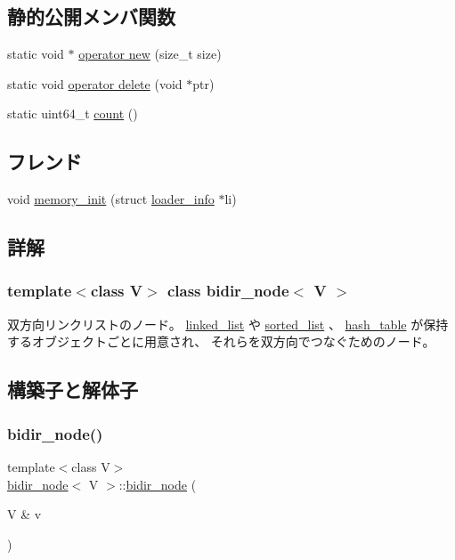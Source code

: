 \subsection*{静的公開メンバ関数}
\begin{DoxyCompactItemize}
\item 
static void $\ast$ \hyperlink{classbidir__node_aec71c6df26420dff2ffdf5a43f8b613e}{operator new} (size\+\_\+t size)
\item 
static void \hyperlink{classbidir__node_a50277ce12bf4fccf682ad0a7d70b4e0b}{operator delete} (void $\ast$ptr)
\item 
static uint64\+\_\+t \hyperlink{classbidir__node_a9851f8255f82458826f5a4c615de9a2a}{count} ()
\end{DoxyCompactItemize}
\subsection*{フレンド}
\begin{DoxyCompactItemize}
\item 
void \hyperlink{classbidir__node_a8840f01b46a3b9c43a461591a579c1bd}{memory\+\_\+init} (struct \hyperlink{structloader__info}{loader\+\_\+info} $\ast$li)
\end{DoxyCompactItemize}


\subsection{詳解}
\subsubsection*{template$<$class V$>$\newline
class bidir\+\_\+node$<$ V $>$}

双方向リンクリストのノード。 \hyperlink{classlinked__list}{linked\+\_\+list} や \hyperlink{classsorted__list}{sorted\+\_\+list} 、 \hyperlink{classhash__table}{hash\+\_\+table} が保持するオブジェクトごとに用意され、 それらを双方向でつなぐためのノード。 

\subsection{構築子と解体子}
\hypertarget{classbidir__node_a854687b3c2abf8087c390bc4d7ef90d9}{}\label{classbidir__node_a854687b3c2abf8087c390bc4d7ef90d9} 
\subsubsection{\texorpdfstring{bidir\+\_\+node()}{bidir\_node()}\hspace{0.1cm}{\footnotesize\ttfamily [1/4]}}
{\footnotesize\ttfamily template$<$class V$>$ \\
\hyperlink{classbidir__node}{bidir\+\_\+node}$<$ V $>$\+::\hyperlink{classbidir__node}{bidir\+\_\+node} (\begin{DoxyParamCaption}\item[{V \&}]{v }\end{DoxyParamCaption})}

